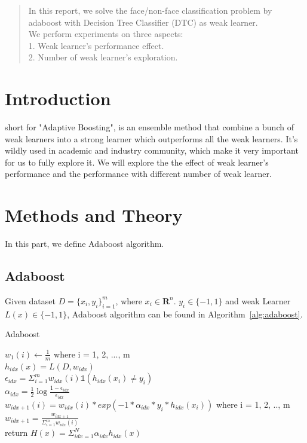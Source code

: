 \documentclass[journal, a4paper]{IEEEtran}
\begin{document}
\begin{abstract}
In this report, we solve the face/non-face classification problem by adaboost with Decision Tree Classifier (DTC) as weak learner. \\
We perform experiments on three aspects: \\
1. Weak learner's performance effect. \\
2. Number of weak learner's exploration. \\
\end{abstract}

\section{Introduction}
 short for "Adaptive Boosting",  is an ensemble method that combine a bunch of weak learners into a strong learner which outperforms all the weak learners. It's wildly used in academic and industry community, which make it very important for us to fully explore it. We will explore the the effect of weak learner's performance and the performance with different number of weak learner. 

\section{Methods and Theory}
In this part, we define Adaboost algorithm.
\subsection{Adaboost}
Given dataset $ D=\{x_{i}, y_{i}\}_{i=1}^{m}$, where $x_{i} \in \mathbf{R}^{n}$. $y_{i} \in \{-1, 1\}$ and weak Learner $L(x) \in \{-1, 1\} $, Adaboost algorithm can be found in Algorithm~\ref{alg:adaboost}. \par

\begin{algorithm}
	\label{alg:adaboost}
	\caption{Adaboost}
	$w_1(i) \gets \frac{1}{m}$ where i = 1, 2, ..., m \\
	{
		$h_{idx}(x) = L(D, w_{idx})$ \\
		$\epsilon_{idx} = \Sigma_{i=1}^m w_{idx}(i) \mathbb{1}(h_{idx}(x_i) \neq y_i) $ \\
		$\alpha_{idx} = \frac{1}{2} \log{\frac{1 - \epsilon_{idx}}{\epsilon_{idx}}}$ \\
		$w_{idx+1}(i) = w_{idx}(i) * exp(-1 * \alpha_{idx} * y_i * h_{idx}(x_i))$ where i = 1, 2, .., m \\
		$w_{idx+1} = \frac{w_{idx+1}}{\Sigma_{i=1}^m w_{idx}(i)}  $ \\
	}
	return $H(x) = \Sigma_{idx=1}^N \alpha_{idx} h_{idx}(x)$
\end{algorithm} \par
\end{document}
